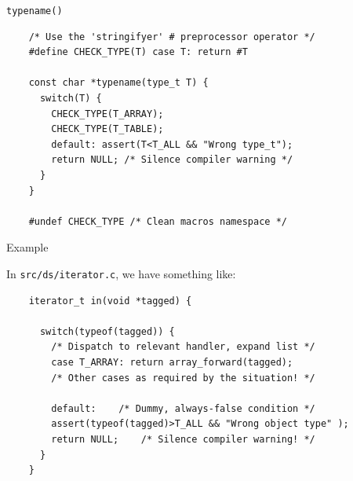\begin{frame}[fragile]{\lstinline{typename()}}

  \begin{lstlisting}
    /* Use the 'stringifyer' # preprocessor operator */
    #define CHECK_TYPE(T) case T: return #T

    const char *typename(type_t T) {
      switch(T) {
        CHECK_TYPE(T_ARRAY);
        CHECK_TYPE(T_TABLE);
        default: assert(T<T_ALL && "Wrong type_t");
        return NULL; /* Silence compiler warning */
      }
    }

    #undef CHECK_TYPE /* Clean macros namespace */
  \end{lstlisting}

\end{frame}


\begin{frame}[fragile]{Example}

  In \lstinline{src/ds/iterator.c}, we have something like:
  \begin{lstlisting}
    iterator_t in(void *tagged) {

      switch(typeof(tagged)) {
        /* Dispatch to relevant handler, expand list */
        case T_ARRAY: return array_forward(tagged);
        /* Other cases as required by the situation! */

        default:    /* Dummy, always-false condition */
        assert(typeof(tagged)>T_ALL && "Wrong object type" );
        return NULL;    /* Silence compiler warning! */
      }
    }
  \end{lstlisting}

\end{frame}


